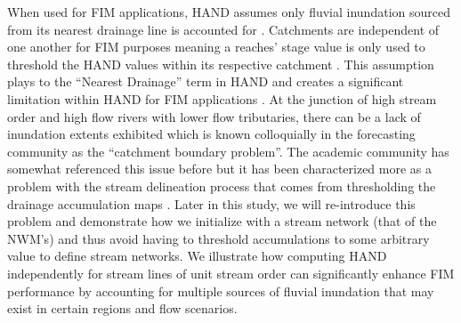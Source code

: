 When used for FIM applications, HAND assumes only fluvial inundation sourced from its nearest drainage line is accounted for \cite{nobre2016hand,mcgehee2016modified}.
Catchments are independent of one another for FIM purposes meaning a reaches' stage value is only used to threshold the HAND values within its respective catchment \cite{liu2016cybergis,zheng2018river,zheng2018geoflood}.
This assumption plays to the ``Nearest Drainage'' term in HAND and creates a significant limitation within HAND for FIM applications \cite{zhang2018comparative,mcgehee2016modified,li2020evaluation,nobre2016hand}.
At the junction of high stream order and high flow rivers with lower flow tributaries, there can be a lack of inundation extents exhibited which is known colloquially in the forecasting community as the ``catchment boundary problem''.
The academic community has somewhat referenced this issue before but it has been characterized more as a problem with the stream delineation process that comes from thresholding the drainage accumulation maps \cite{nobre2016hand,li2020evaluation}.
Later in this study, we will re-introduce this problem and demonstrate how we initialize with a stream network (that of the NWM's) and thus avoid having to threshold accumulations to some arbitrary value to define stream networks.
We illustrate how computing HAND independently for stream lines of unit stream order can significantly enhance FIM performance by accounting for multiple sources of fluvial inundation that may exist in certain regions and flow scenarios.
%
